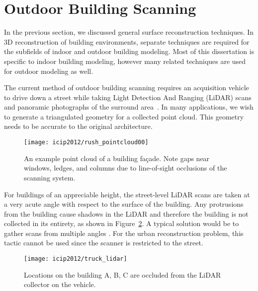 \documentclass[12pt,onecolumn,oneside]{book}
\begin{document}
\section{Outdoor Building Scanning}
\label{sec:outdoor_scanning}

In the previous section, we discussed general surface reconstruction techniques.  In 3D reconstruction of building environments, separate techniques are required for the subfields of indoor and outdoor building modeling.  Most of this dissertation is specific to indoor building modeling, however many related techniques are used for outdoor modeling as well.

The current method of outdoor building scanning requires an acquisition vehicle to drive down a street while taking Light Detection And Ranging (LiDAR) scans and panoramic photographs of the surround area~\cite{Zakhor07,Chen07,Karimi00,Li97}.  In many applications, we wish to generate a triangulated geometry for a collected point cloud.  This geometry needs to be accurate to the original architecture.  

\begin{figure}
	\begin{minipage}[b]{1.0\linewidth}
	  \centering
	  \centerline{\texttt{[image: icip2012/rush\_pointcloud00]}}
	\end{minipage}

	\caption[An example point cloud of a building fa\c{c}ade.]{An example point cloud of a building fa\c{c}ade. Note gaps near windows, ledges, and columns due to line-of-sight occlusions of the scanning system.}
	\label{fig:rush_points}
\end{figure}

For buildings of an appreciable height, the street-level LiDAR scans are taken at a very acute angle with respect to the surface of the building.  Any protrusions from the building cause shadows in the LiDAR and therefore the building is not collected in its entirety, as shown in Figure~\ref{fig:truck_lidar}.  A typical solution would be to gather scans from multiple angles \cite{Tang10, SignedDistanceFields}.  For the urban reconstruction problem, this tactic cannot be used since the scanner is restricted to the street.

\begin{figure}[t]

\begin{minipage}[b]{1.0\linewidth}
  \centering
  \centerline{\texttt{[image: icip2012/truck\_lidar]}}
\end{minipage}

\caption[Scanning building fa\c{c}ades from a vehicle.]{Locations on the building A, B, C are occluded from the LiDAR collector on the vehicle.}
\label{fig:truck_lidar}

\end{figure}
\end{document}
